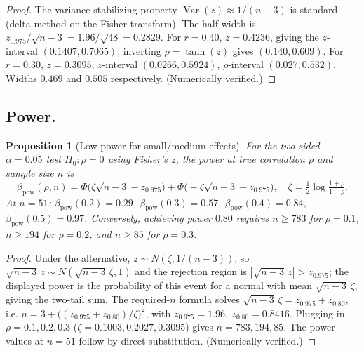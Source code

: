 \documentclass{amsart}
\newtheorem{proposition}{Proposition}
\theoremstyle{definition}
\begin{document}
\begin{proof}
The variance-stabilizing property $\operatorname{Var}(z)\approx 1/(n-3)$ is
standard (delta method on the Fisher transform). The half-width is
$z_{0.975}/\sqrt{n-3}=1.96/\sqrt{48}=0.2829$. For $r=0.40$,
$z=0.4236$, giving the $z$-interval $(0.1407,0.7065)$; inverting
$\rho=\tanh(z)$ gives $(0.140,0.609)$. For $r=0.30$, $z=0.3095$,
$z$-interval $(0.0266,0.5924)$, $\rho$-interval $(0.027,0.532)$. Widths
$0.469$ and $0.505$ respectively. (Numerically verified.)
\end{proof}

\subsection*{Power.}
\begin{proposition}[Low power for small/medium effects]\label{prop:power}
For the two-sided $\alpha=0.05$ test $H_0:\rho=0$ using Fisher's $z$, the
power at true correlation $\rho$ and sample size $n$ is
\[
  \beta_{\text{pow}}(\rho,n)
   =\Phi\!\Big(\zeta\sqrt{n-3}-z_{0.975}\Big)
   +\Phi\!\Big(-\zeta\sqrt{n-3}-z_{0.975}\Big),
   \quad \zeta=\tfrac12\log\tfrac{1+\rho}{1-\rho}.
\]
At $n=51$: $\beta_{\text{pow}}(0.2)=0.29$, $\beta_{\text{pow}}(0.3)=0.57$,
$\beta_{\text{pow}}(0.4)=0.84$, $\beta_{\text{pow}}(0.5)=0.97$.
Conversely, achieving power $0.80$ requires $n\ge 783$ for $\rho=0.1$,
$n\ge 194$ for $\rho=0.2$, and $n\ge 85$ for $\rho=0.3$.
\end{proposition}

\begin{proof}
Under the alternative, $z\sim N(\zeta,1/(n-3))$, so $\sqrt{n-3}\,z\sim
N(\sqrt{n-3}\,\zeta,1)$ and the rejection region is
$|\sqrt{n-3}\,z|>z_{0.975}$; the displayed power is the probability of this
event for a normal with mean $\sqrt{n-3}\,\zeta$, giving the two-tail sum.
The required-$n$ formula solves
$\sqrt{n-3}\,\zeta=z_{0.975}+z_{0.80}$, i.e.
$n=3+\big((z_{0.975}+z_{0.80})/\zeta\big)^2$, with
$z_{0.975}=1.96,\ z_{0.80}=0.8416$. Plugging in $\rho=0.1,0.2,0.3$
($\zeta=0.1003,0.2027,0.3095$) gives $n=783,194,85$. The power values at
$n=51$ follow by direct substitution. (Numerically verified.)
\end{proof}
\end{document}

